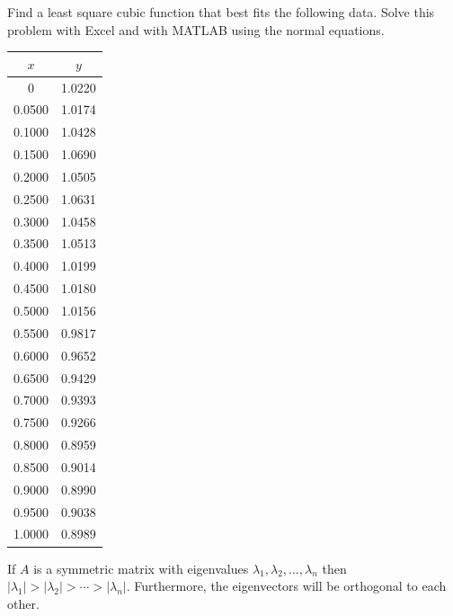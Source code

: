 \begin{problem}
    Find a least square cubic function that best fits the following data. Solve this
    problem with Excel and with MATLAB using the normal equations.
    \begin{center}
        \begin{tabular}{|c|c|}
            \hline
            $x$ & $y$ \\\hline \hline
            0   & 1.0220\\
            0.0500&   1.0174\\
            0.1000&   1.0428\\
            0.1500&   1.0690\\
            0.2000&   1.0505\\
            0.2500&   1.0631\\
            0.3000&   1.0458\\
            0.3500&   1.0513\\
            0.4000&   1.0199\\
            0.4500&   1.0180\\
            0.5000&   1.0156\\
            0.5500&   0.9817\\
            0.6000&   0.9652\\
            0.6500&   0.9429\\
            0.7000&   0.9393\\
            0.7500&   0.9266\\
            0.8000&   0.8959\\
            0.8500&   0.9014\\
            0.9000&   0.8990\\
            0.9500&   0.9038\\
            1.0000&   0.8989 \\\hline
        \end{tabular}
    \end{center}
\end{problem}



\begin{thm}\label{thm:symmetric_matrix_thm}
    If $A$ is a symmetric matrix with eigenvalues $\lambda_1, \lambda_2, \ldots,
    \lambda_n$ then $|\lambda_1| > |\lambda_2| > \cdots > |\lambda_n|$.  Furthermore, the
    eigenvectors will be orthogonal to each other. 
\end{thm}


